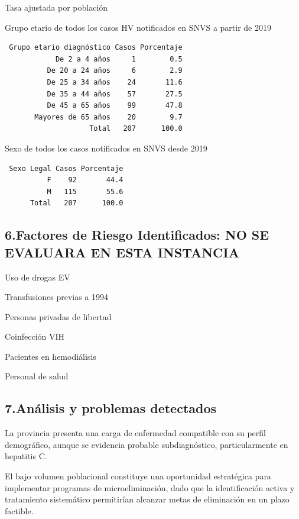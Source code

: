 \documentclass[
  letterpaper,
  DIV=11,
  numbers=noendperiod]{scrartcl}
\begin{document}
Tasa ajustada por población

Grupo etario de todos los casos HV notificados en SNVS a partir de 2019

\begin{verbatim}
 Grupo etario diagnóstico Casos Porcentaje
            De 2 a 4 años     1        0.5
          De 20 a 24 años     6        2.9
          De 25 a 34 años    24       11.6
          De 35 a 44 años    57       27.5
          De 45 a 65 años    99       47.8
       Mayores de 65 años    20        9.7
                    Total   207      100.0
\end{verbatim}

Sexo de todos los casos notificados en SNVS desde 2019

\begin{verbatim}
 Sexo Legal Casos Porcentaje
          F    92       44.4
          M   115       55.6
      Total   207      100.0
\end{verbatim}

\hypertarget{factores-de-riesgo-identificados-no-se-evaluara-en-esta-instancia}{%
\subsection{\texorpdfstring{\textbf{6.Factores de Riesgo Identificados:
NO SE EVALUARA EN ESTA
INSTANCIA}}{6.Factores de Riesgo Identificados: NO SE EVALUARA EN ESTA INSTANCIA}}\label{factores-de-riesgo-identificados-no-se-evaluara-en-esta-instancia}}

Uso de drogas EV

Transfusiones previas a 1994

Personas privadas de libertad

Coinfección VIH

Pacientes en hemodiálisis

Personal de salud

\hypertarget{anuxe1lisis-y-problemas-detectados}{%
\subsection{\texorpdfstring{\textbf{7.Análisis y problemas
detectados}}{7.Análisis y problemas detectados}}\label{anuxe1lisis-y-problemas-detectados}}

La provincia presenta una carga de enfermedad compatible con su perfil
demográfico, aunque se evidencia probable subdiagnóstico,
particularmente en hepatitis C.

El bajo volumen poblacional constituye una oportunidad estratégica para
implementar programas de microeliminación, dado que la identificación
activa y tratamiento sistemático permitirían alcanzar metas de
eliminación en un plazo factible.
\end{document}
